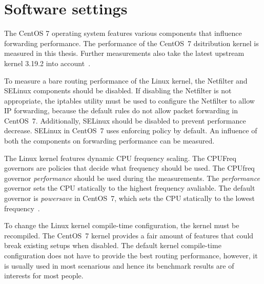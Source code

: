 
\section{Software settings}\label{sec:analysis-settings}
The CentOS 7 operating system features various components that influence forwarding performance.
The performance of the CentOS~7 dsitribution kernel is measured in this thesis.
Further measurements also take the latest upstream kernel 3.19.2 into account~\cite{kernel-source}.

To measure a bare routing performance of the Linux kernel,
the Netfilter and SELinux components should be disabled.
If disabling the Netfilter is not appropriate, the iptables utility must be used to configure the Netfilter to allow IP forwarding,
because the default rules do not allow packet forwarding in CentOS~7.
Additionally, SELinux should be disabled to prevent performance decrease.
SELinux in CentOS~7 uses enforcing policy by default.
An influence of both the components on forwarding performance can be measured.

The Linux kernel features dynamic CPU frequency scaling.
The CPUFreq governors are policies that decide what frequency should be used.
The CPUfreq governor {\it{performance}} should be used during the measurements.
The {\it{performance}} governor sets the CPU statically to the
highest frequency avaliable. %
The default governor is {\it{powersave}} in CentOS~7,
which sets the CPU statically to the lowest frequency~\cite{cpufreq-governors}.

To change the Linux kernel compile-time configuration, the kernel must be recompiled.
The CentOS~7 kernel provides a fair amount of features that could break existing setups when disabled.
The default kernel compile-time configuration does not have to provide the best routing performance,
however, it is usually used in most scenarious and hence its benchmark results are of interests for most people.









